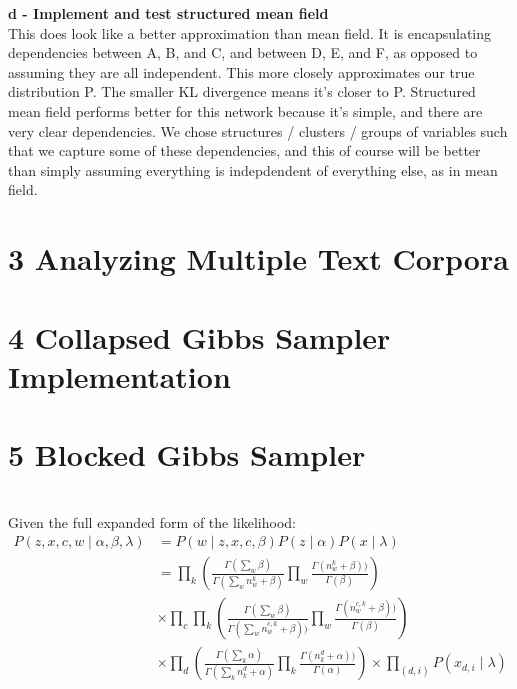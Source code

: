 \documentclass[12pt]{article}
\begin{document}
\noindent \textbf{d - Implement and test structured mean field}\\
This does look like a better approximation than mean field.  It is encapsulating dependencies between A, B, and C, and between D, E, and F, as opposed to assuming they are all independent.  This more closely approximates our true distribution P.  The smaller KL divergence means it's closer to P.  Structured mean field performs better for this network because it's simple, and there are very clear dependencies.  We chose structures / clusters / groups of variables such that we capture some of these dependencies, and this of course will be better than simply assuming everything is indepdendent of everything else, as in mean field.  

\section*{3 Analyzing Multiple Text Corpora}
\section*{4 Collapsed Gibbs Sampler Implementation}
\section*{5 Blocked Gibbs Sampler}
\\
Given the full expanded form of the likelihood:\\
\begin{align}
P (z, x, c, w\mid \alpha, \beta, \lambda) &= P (w \mid z, x, c, \beta)P (z\mid \alpha)P(x\mid \lambda) \nonumber\\
&=\prod_{k}(\frac{\Gamma(\sum_{w} \beta)}{\Gamma(\sum_{w} n^{k}_{w}+\beta)} \prod_{w} \frac{\Gamma(n^{k}_{w}+\beta))}{\Gamma(\beta)} )\nonumber\\
&\times \prod_{c}\prod_{k}(\frac{\Gamma(\sum_{w} \beta)}{\Gamma(\sum_{w} n^{c,k}_{w}+\beta))} \prod_{w} \frac{\Gamma(n^{c,k}_{w}+\beta))}{\Gamma(\beta)} )\nonumber\\
&\times \prod_{d}(\frac{\Gamma(\sum_{k} \alpha)}{\Gamma(\sum_{k} n^{d}_{k}+\alpha)} \prod_{k} \frac{\Gamma(n^{d}_{k}+\alpha))}{\Gamma(\alpha)} ) \times \prod_{(d,i)} P(x_{d,i} \mid \lambda)\nonumber\\
\end{align}
\end{document}
